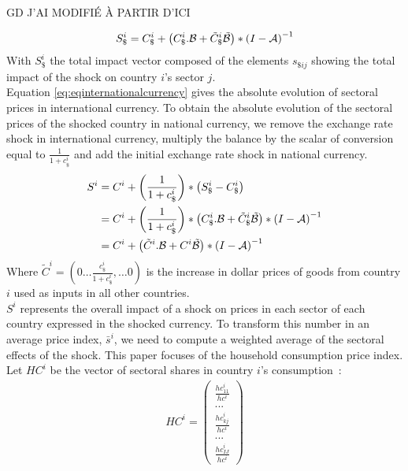 \documentclass[11pt,a4paper]{article}
\begin{document}
GD J'AI MODIFIÉ À PARTIR D'ICI
 
 \begin{eqnarray}
S_\$^i=C_\$^i+\left(C_\$^i.{\cal B}+{\tilde{C}_\$^i}{\tilde{{\cal B}}}\right)*{{(I-{\cal A})}^{-1}}	
\label{eq:eqinternationalcurrency}
 \end{eqnarray}
With $S_\$^i$ the total impact vector composed of the elements ${{{s}}_{\$ij}}$ showing the total impact of the shock on country $i$'s sector $j$. \\

Equation \ref{eq:eqinternationalcurrency} gives the absolute evolution of sectoral prices in international currency. To obtain the absolute evolution of the sectoral prices of the shocked country in national currency, we remove the exchange rate shock in international currency, multiply the balance by the scalar of conversion equal to $\frac{1}{1+c_\$^i}$ and add the initial exchange rate shock in national currency.
\begin{equation}
\begin{aligned}
	S^i&=C^i  + \left( \frac{1}{1+{{c}_\$^i}}\right)*\left({S_\$^i}-{{C}_{\$}^i}\right)\\
	&=C^i + \left( \frac{1}{1+{{c}_\$^i}}\right)*\left(C_\$^i.{\cal B}+{\tilde{C}_\$^i}{\tilde{{\cal B}}}\right)*{{(I-{\cal A})}^{-1}} 	\\
	&=C^i	+ \left(\tilde{C}^i.{\cal B}+{C^i}{\tilde{{\cal B}}}\right)*{{(I-{\cal A})}^{-1}}	
\label{eq:eqdomcurrency}
\end{aligned}
\end{equation}
Where $\tilde{C}^i=\left(0 \ldots \frac{c_\$^i}{1+c_\$^i},\ldots 0 \right)$ is the increase in dollar prices of goods from country $i$ used as inputs in all other countries.\\ 
$S^i$ represents the overall impact of a shock on prices in each sector of each country expressed in the shocked currency. To transform this number in an average price index, $\bar{s}^i$, we need to compute a weighted average of the sectoral effects of the shock. This paper focuses of the household consumption price index. Let $HC^i$ be the vector of sectoral shares in country $i$'s consumption :
\begin{eqnarray*}
HC^i=\left( 
	\begin{array}{c}
	\frac{{hc}_{11}^i}{hc^i} \\
	...\\
	\frac{{hc}_{kj}^i}{hc^i}\\
	...\\
	\frac{{hc}_{IJ}^i}{hc^i}
	 \end{array}
	 \right)
\end{eqnarray*}
\end{document}
